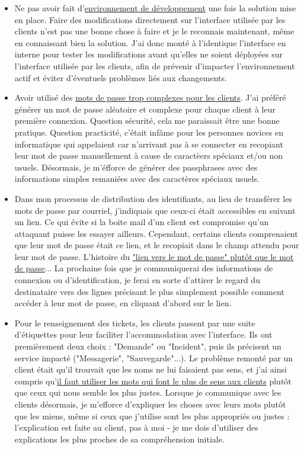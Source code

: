 \begin{itemize}
  \item Ne pas avoir fait d'\underline{environnement de développement} une fois la solution mise en place. Faire des modifications directement sur l'interface utilisée par les clients n'est pas une bonne chose à faire et je le reconnais maintenant, même en connaissant bien la solution. J'ai donc monté à l'identique l'interface en interne pour tester les modifications avant qu'elles ne soient déployées sur l'interface utilisée par les clients, afin de prévenir d'impacter l'environnement actif et éviter d'éventuels problèmes liés aux changements. 
  \item Avoir utilisé des \underline{mots de passe trop complexes pour les clients}. J’ai préféré générer un mot de passe aléatoire et complexe pour chaque client à leur première connexion. Question sécurité, cela me paraissait être une bonne pratique. Question practicité, c’était infâme pour les personnes novices en informatique qui appelaient car n'arrivant pas à se connecter en recopiant leur mot de passe manuellement à cause de caractèers spéciaux et/ou non usuels. Désormais, je m'éfforce de générer des passphrases avec des informations simples remaniées avec des caractères spéciaux usuels.
  \item Dans mon processus de distribution des identifiants, au lieu de transférer les mots de passe par courriel, j’indiquais que ceux-ci était accessibles en suivant un lien. Ce qui évite si la boite mail d’un client est compromise qu'un attaquant puisse les essayer ailleurs. Cependant, certains clients comprenaient que leur mot de passe était ce lien, et le recopiait dans le champ attendu pour leur mot de passe. L’histoire du \underline{"lien vers le mot de passe" plutôt que le mot de passe}... La prochaine fois que je communiquerai des informations de connexion ou d’identification, je ferai en sorte d’attirer le regard du destinataire vers des lignes précisant le plus simplement possible comment accéder à leur mot de passe, en cliquant d'abord sur le lien.
  \item Pour le renseignement des tickets, les clients passent par une suite d’étiquettes pour leur faciliter l’accommodation avec l’interface. Ils ont premièrement deux choix : "Demande" ou "Incident", puis ils précisent un service impacté ("Messagerie", "Sauvegarde"...). Le problème remonté par un client était qu'il trouvait que les noms ne lui faisaient pas sens, et j'ai ainsi compris qu'\underline{il faut utiliser les mots qui font le plus de sens aux clients} plutôt que ceux qui nous semble les plus justes. Lorsque je communique avec les clients désormais, je m’efforce d’expliquer les choses avec leurs mots plutôt que les miens, même si ceux que j’utilise sont les plus appropriés ou justes : l'explication est faite au client, pas à moi - je me dois d'utiliser des explications les plus proches de sa compréhension initiale.
\end{itemize}

